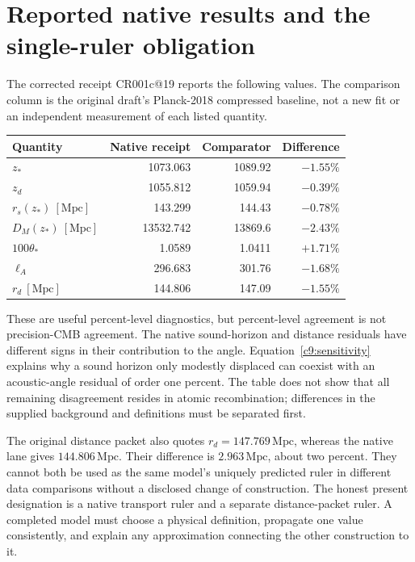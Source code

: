 \section{Reported native results and the single-ruler obligation}

The corrected receipt CR001c@19 reports the following values. The comparison column is the original draft's Planck-2018 compressed baseline, not a new fit or an independent measurement of each listed quantity.
\begin{center}
\small\setlength{\tabcolsep}{3pt}
\begin{tabular}{@{}lrrr@{}}
\toprule
Quantity & Native receipt & Comparator & Difference\\
\midrule
$z_*$ &1073.063&1089.92&$-1.55\%$\\
$z_d$ &1055.812&1059.94&$-0.39\%$\\
$r_s(z_*)\ [\mathrm{Mpc}]$ &143.299&144.43&$-0.78\%$\\
$D_M(z_*)\ [\mathrm{Mpc}]$ &13532.742&13869.6&$-2.43\%$\\
$100\theta_*$ &1.0589&1.0411&$+1.71\%$\\
$\ell_A$ &296.683&301.76&$-1.68\%$\\
$r_d\ [\mathrm{Mpc}]$ &144.806&147.09&$-1.55\%$\\
\bottomrule
\end{tabular}
\end{center}

These are useful percent-level diagnostics, but percent-level agreement is not precision-CMB agreement. The native sound-horizon and distance residuals have different signs in their contribution to the angle. Equation~\eqref{c9:sensitivity} explains why a sound horizon only modestly displaced can coexist with an acoustic-angle residual of order one percent. The table does not show that all remaining disagreement resides in atomic recombination; differences in the supplied background and definitions must be separated first.

The original distance packet also quotes $r_d=147.769\,\mathrm{Mpc}$, whereas the native lane gives $144.806\,\mathrm{Mpc}$. Their difference is $2.963\,\mathrm{Mpc}$, about two percent. They cannot both be used as the same model's uniquely predicted ruler in different data comparisons without a disclosed change of construction. The honest present designation is a native transport ruler and a separate distance-packet ruler. A completed model must choose a physical definition, propagate one value consistently, and explain any approximation connecting the other construction to it.

